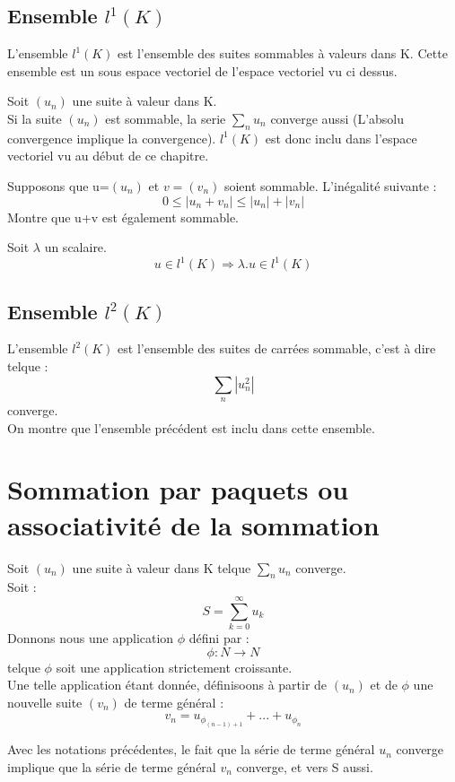 \subsection{Ensemble $l^1(K)$}
\begin{de}
L'ensemble $l^1(K)$ est l'ensemble des suites sommables à valeurs dans K. Cette ensemble est un sous espace vectoriel de l'espace vectoriel vu ci dessus.
\end{de}
\begin{prop}
Soit $(u_n)$ une suite à valeur dans K.\\
Si la suite $(u_n)$ est sommable, la serie $\underset{n}\sum u_n$ converge aussi (L'absolu convergence implique la convergence). $l^1(K)$ est donc inclu dans l'espace vectoriel vu au début de ce chapitre.
\end{prop}
\begin{prop}
Supposons que u=$(u_n)$ et $v=(v_n)$ soient sommable. L'inégalité suivante : 
$$0 \leq |u_n + v_n|\leq|u_n|+|v_n|$$
Montre que u+v est également sommable.
\end{prop}
\begin{prop}
Soit $\lambda$ un scalaire.
$$u \in l^1(K) \Rightarrow \lambda.u \in l^1(K)$$
\end{prop}
\subsection{Ensemble $l^2(K)$}
\begin{de}
L'ensemble $l^2(K)$ est l'ensemble des suites de carrées sommable, c'est à dire telque :
$$\sum_n |u_n^2|$$
converge.\\
On montre que l'ensemble précédent est inclu dans cette ensemble.
\end{de}
\section{Sommation par paquets ou associativité de la sommation}
\begin{de}
Soit $(u_n)$ une suite à valeur dans K telque $\underset{n}\sum u_n$ converge.\\
Soit :
$$S = \sum_{k=0}^{\infty} u_k$$
Donnons nous une application $\phi$ défini par :
$$\phi : N \rightarrow N$$
telque $\phi$ soit une application strictement croissante.\\
Une telle application étant donnée, définisoons à partir de $(u_n)$ et de $\phi$ une nouvelle suite $(v_n)$ de terme général : 
$$v_n = u_{\phi_{(n-1)+1}}+...+u_{\phi_n}$$
\end{de}
\begin{prop}
Avec les notations précédentes, le fait que la série de terme général $u_n$ converge implique que la série de terme général $v_n$ converge, et vers S aussi.
\end{prop}

